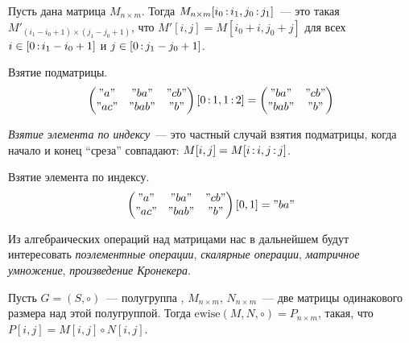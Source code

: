 \begin{definition}
    Пусть дана матрица $M_{n\times m}$.
    Тогда $M_{n \times m}[i_0 \rng i_1, j_0 \rng j_1]$~--- это такая $M'_{(i_1 - i_0 + 1) \times (j_1 - j_0 + 1)}$, что $M'[i, j] = M[i_0 + i, j_0 + j]$ для всех $i \in [0 \rng i_1 - i_0 + 1]$ и $j \in [0 \rng j_1 - j_0 + 1]$.
\end{definition}

\begin{example}
    Взятие подматрицы.
    \begin{multline*}
        \begin{pmatrix}
            "a"  & "ba"  & "cb" \\
            "ac" & "bab" & "b"
        \end{pmatrix} [0 \rng 1, 1 \rng 2] =
        \begin{pmatrix}
            "ba"  & "cb" \\
            "bab" & "b"
        \end{pmatrix}
    \end{multline*}
\end{example}

\begin{definition}
    \emph{Взятие элемента по индексу}~--- это частный случай взятия подматрицы, когда начало и конец \enquote{среза} совпадают: $M[i, j] = M[i \rng i, j \rng j]$.
\end{definition}

\begin{example}
    Взятие элемента по индексу.
    \[
        \begin{pmatrix}
            "a"  & "ba"  & "cb" \\
            "ac" & "bab" & "b"
        \end{pmatrix}[0, 1] = "ba"
    \]
\end{example}

Из алгебраических операций над матрицами нас в дальнейшем будут интересовать \emph{поэлементные операции}, \emph{скалярные операции}, \emph{матричное умножение}, \emph{произведение Кронекера}.

\begin{definition}
    Пусть $G = (S, \circ)$~--- полугруппа%
    , $M_{n \times m}$, $N_{n \times m}$~--- две матрицы одинакового размера над этой полугруппой.
    Тогда $\mathrm{ewise}(M, N, \circ) = P_{n \times m}$, такая, что $P[i, j] = M[i, j] \circ N[i, j]$.
\end{definition}

